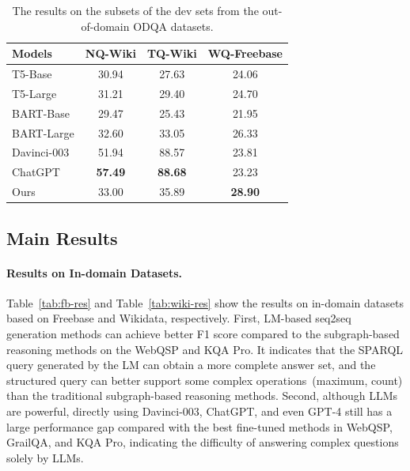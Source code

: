 \begin{table}[t]
	\centering
	\small
            \begin{tabular}{l  c  c c }
			\toprule
			\textbf{Models} & \textbf{NQ-Wiki} & \textbf{TQ-Wiki} & \textbf{WQ-Freebase} \\
			\midrule
			T5-Base & 30.94 & 27.63 & 24.06 \\
			T5-Large & 31.21 & 29.40 &  {24.70} \\
			BART-Base & 29.47 & 25.43 & 21.95 \\
			BART-Large	& 32.60 & 33.05 & 26.33 \\
                \midrule
                Davinci-003  & 51.94 & 88.57 & 23.81 \\
			ChatGPT  & \textbf{57.49} & \textbf{88.68}  & 23.23 \\
                \midrule
                Ours & 33.00 & 35.89 & \textbf{28.90} \\
    		\bottomrule
		\end{tabular}
        \caption{The results on the subsets of the dev sets from the out-of-domain ODQA datasets.}%
	\label{tab:out-domain}
\end{table}

\subsection{Main Results}
\paragraph{Results on In-domain Datasets.}
Table~\ref{tab:fb-res} and Table~\ref{tab:wiki-res} show the results on in-domain datasets based on Freebase and Wikidata, respectively. 
First, LM-based seq2seq generation methods can achieve better F1 score compared to the subgraph-based reasoning methods on the WebQSP and KQA Pro. It indicates that the SPARQL query generated by the LM can obtain a more complete answer set, and the structured query can better support some complex operations~(\eg maximum, count) than the traditional subgraph-based reasoning methods. 
Second, although LLMs are powerful, directly using Davinci-003, ChatGPT, and even GPT-4 still has a large performance gap compared with the best fine-tuned methods in WebQSP, GrailQA, and KQA Pro, indicating the difficulty of answering complex questions solely by LLMs. 

